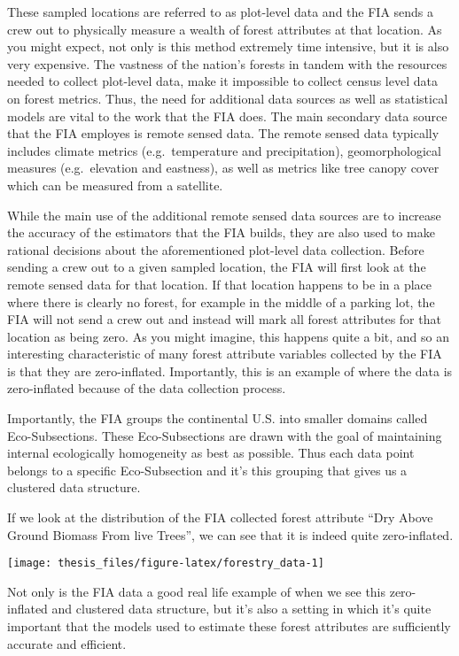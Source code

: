 \documentclass[12pt,twoside]{reedthesis}
\begin{document}
These sampled locations are referred to as plot-level data and the FIA sends a crew out to physically measure a wealth of forest attributes at that location. As you might expect, not only is this method extremely time intensive, but it is also very expensive. The vastness of the nation's forests in tandem with the resources needed to collect plot-level data, make it impossible to collect census level data on forest metrics. Thus, the need for additional data sources as well as statistical models are vital to the work that the FIA does. The main secondary data source that the FIA employes is remote sensed data. The remote sensed data typically includes climate metrics (e.g.~temperature and precipitation), geomorphological measures (e.g.~elevation and eastness), as well as metrics like tree canopy cover which can be measured from a satellite.

While the main use of the additional remote sensed data sources are to increase the accuracy of the estimators that the FIA builds, they are also used to make rational decisions about the aforementioned plot-level data collection. Before sending a crew out to a given sampled location, the FIA will first look at the remote sensed data for that location. If that location happens to be in a place where there is clearly no forest, for example in the middle of a parking lot, the FIA will not send a crew out and instead will mark all forest attributes for that location as being zero. As you might imagine, this happens quite a bit, and so an interesting characteristic of many forest attribute variables collected by the FIA is that they are zero-inflated. Importantly, this is an example of where the data is zero-inflated because of the data collection process.

Importantly, the FIA groups the continental U.S. into smaller domains called Eco-Subsections. These Eco-Subsections are drawn with the goal of maintaining internal ecologically homogeneity as best as possible. Thus each data point belongs to a specific Eco-Subsection and it's this grouping that gives us a clustered data structure.

If we look at the distribution of the FIA collected forest attribute ``Dry Above Ground Biomass From live Trees'', we can see that it is indeed quite zero-inflated.
\begin{center}\texttt{[image: thesis\_files/figure-latex/forestry\_data-1]} \end{center}

Not only is the FIA data a good real life example of when we see this zero-inflated and clustered data structure, but it's also a setting in which it's quite important that the models used to estimate these forest attributes are sufficiently accurate and efficient.
\end{document}
